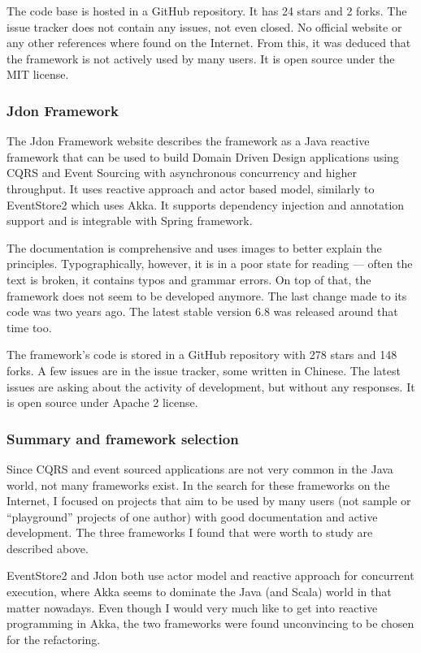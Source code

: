 \documentclass{book}
\begin{document}
The code base is hosted in a GitHub repository. It has 24 stars and 2
forks. The issue tracker does not contain any issues, not even closed.
No official website or any other references where found on the Internet.
From this, it was deduced that the framework is not actively used by
many users. It is open source under the MIT license.

\subsubsection{Jdon Framework}\label{jdon-framework}

The Jdon Framework \cite{jdon} website describes the framework as a Java
reactive framework that can be used to build Domain Driven Design
applications using CQRS and Event Sourcing with asynchronous concurrency
and higher throughput. It uses reactive approach and actor based model,
similarly to EventStore2 which uses Akka. It supports dependency
injection and annotation support and is integrable with Spring
framework.

The documentation is comprehensive and uses images to better explain the
principles. Typographically, however, it is in a poor state for reading
--- often the text is broken, it contains typos and grammar errors. On
top of that, the framework does not seem to be developed anymore. The
last change made to its code was two years ago. The latest stable
version 6.8 was released around that time too.

The framework's code is stored in a GitHub repository with 278 stars and
148 forks. A few issues are in the issue tracker, some written in
Chinese. The latest issues are asking about the activity of development,
but without any responses. It is open source under Apache 2 license.

\subsubsection{Summary and framework
selection}\label{summary-and-framework-selection}

Since CQRS and event sourced applications are not very common in the
Java world, not many frameworks exist. In the search for these
frameworks on the Internet, I focused on projects that aim to be used by
many users (not sample or ``playground'' projects of one author) with
good documentation and active development. The three frameworks I found
that were worth to study are described above.

EventStore2 and Jdon both use actor model and reactive approach
\cite{actor} for concurrent execution, where Akka seems to dominate the
Java (and Scala) world in that matter nowadays. Even though I would very
much like to get into reactive programming in Akka, the two frameworks
were found unconvincing to be chosen for the refactoring.
\end{document}
